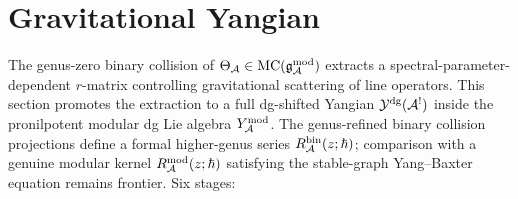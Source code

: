 %

\section{Gravitational Yangian}
\label{sec:thqg-gravitational-yangian}

\providecommand{\Rescoll}{\operatorname{Res}^{\mathrm{coll}}}
\providecommand{\Fcoll}{F^{\bullet}_{\mathrm{coll}}}
\providecommand{\grcoll}{\operatorname{gr}_{\mathrm{coll}}}
\providecommand{\Sh}{\operatorname{Sh}}
\providecommand{\Aut}{\operatorname{Aut}}
\providecommand{\Hom}{\operatorname{Hom}}
\providecommand{\End}{\operatorname{End}}
\providecommand{\Tr}{\operatorname{Tr}}
\providecommand{\Sym}{\operatorname{Sym}}
\providecommand{\ad}{\operatorname{ad}}
\providecommand{\Res}{\operatorname{Res}}
\providecommand{\Spec}{\operatorname{Spec}}
\providecommand{\id}{\mathrm{id}}
\providecommand{\rank}{\operatorname{rank}}
\providecommand{\cofib}{\operatorname{cofib}}
\providecommand{\Ymod}{Y^{\mathrm{mod}}}
\providecommand{\ModEnv}{\operatorname{ModEnv}}
\providecommand{\CE}{\operatorname{CE}}
\providecommand{\wt}{\operatorname{wt}}
\providecommand{\HS}{\operatorname{HS}}
\providecommand{\Fred}{\operatorname{Fred}}
\providecommand{\Det}{\operatorname{Det}}
\providecommand{\FM}{\overline{\operatorname{FM}}}
\providecommand{\Rgrav}{R^{\mathrm{grav}}}
\providecommand{\rgrav}{r^{\mathrm{grav}}}

The genus-zero binary collision of $\Theta_{\mathcal{A}} \in \mathrm{MC}(\mathfrak{g}_{\mathcal{A}}^{\mathrm{mod}})$ extracts a spectral-parameter-dependent $r$-matrix controlling gravitational scattering of line operators.
This section promotes the extraction to a full dg-shifted Yangian
$\mathcal{Y}^{\mathrm{dg}}(\mathcal{A}^!)$ inside the pronilpotent modular
dg Lie algebra $\Ymod_\cA$. The genus-refined binary collision
projections define a formal higher-genus series
$R^{\mathrm{bin}}_{\mathcal{A}}(z;\hbar)$; comparison
with a genuine modular kernel
$R^{\mathrm{mod}}_{\mathcal{A}}(z;\hbar)$ satisfying the stable-graph
Yang--Baxter equation remains frontier.
Six stages:

